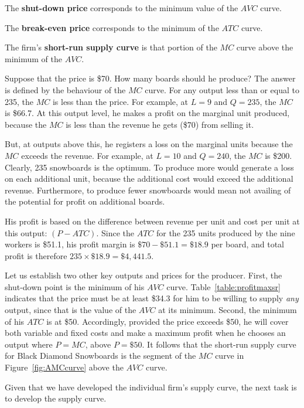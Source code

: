 \newhtmlpage

\begin{DefBox}
	The \textbf{shut-down price} corresponds to the minimum value of the $AVC$ curve.
	
	The \textbf{break-even price} corresponds to the minimum of the $ATC$ curve.
	
	The firm's \textbf{short-run supply curve} is that portion of the $MC$ curve above the minimum of the $AVC$.
\end{DefBox}

Suppose that the price is \$70. How many boards should he produce? The
answer is defined by the behaviour of the $MC$ curve. For any output less
than or equal to 235, the $MC$ is less than the price. For example, at $L=9$
and $Q=235$, the $MC$ is \$66.7. At this output level, he makes a profit on
the marginal unit produced, because the $MC$ is less than the revenue he
gets (\$70) from selling it.

But, at outputs above this, he registers a loss on the marginal units
because the $MC$ exceeds the revenue. For example, at $L=10$ and $Q=240$,
the $MC$ is \$200. Clearly, 235 snowboards is the optimum. To produce more
would generate a loss on each additional unit, because the additional cost
would exceed the additional revenue. Furthermore, to produce fewer
snowboards would mean not availing of the potential for profit on additional
boards.

His profit is based on the difference between revenue per unit and cost per
unit at this output: $(P-ATC)$. Since the $ATC$ for the 235 units produced
by the nine workers is \$51.1, his profit margin is $\$70-\$51.1=\$18.9$
per board, and total profit is therefore $235 \times \$18.9 = \$4,441.5$.

Let us establish two other key outputs and prices for the producer. First,
the shut-down point is the minimum of his $AVC$ curve. Table~\ref{table:profitmaxsr}
indicates that the price must be at least \$34.3 for him
to be willing to supply \textit{any} output, since that is the value of the 
$AVC$ at its minimum. Second, the minimum of his $ATC$ is at \$50.
Accordingly, provided the price exceeds \$50, he will cover both variable
and fixed costs and make a maximum profit when he chooses an output where 
$P=MC$, above $P=\$50$. It follows that the short-run supply curve for
Black Diamond Snowboards is the segment of the $MC$ curve in 
Figure~\ref{fig:AMCcurve} above the $AVC$ curve.

Given that we have developed the individual firm's supply curve, the next
task is to develop the  supply curve.

